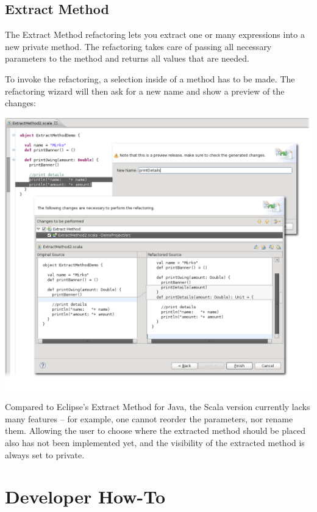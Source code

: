\documentclass[10pt,a4paper,oneside]{scrreprt}
\begin{document}
\section{Extract Method}

The Extract Method refactoring lets you extract one or many expressions into a new private method. The refactoring takes care of passing all necessary parameters to the method and returns all values that are needed.

To invoke the refactoring, a selection inside of a method has to be made. The refactoring wizard will then ask for a new name and show a preview of the changes:

\begin{center}
  \includegraphics[width=\linewidth]{extract_method_screenshot_1.png}
\end{center}

Compared to Eclipse's Extract Method for Java, the Scala version currently lacks many features -- for example, one cannot reorder the parameters, nor rename them. Allowing the user to choose where the extracted method should be placed also has not been implemented yet, and the visibility of the extracted method is always set to private.

\chapter{Developer How-To} \label{chapter:developer-how-to}
\end{document}
